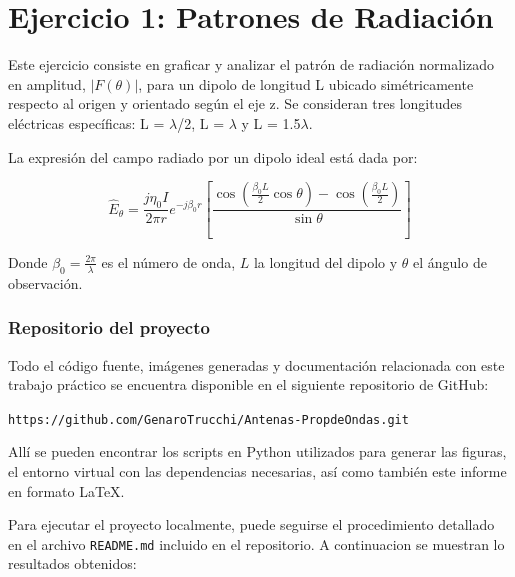 \section{Ejercicio 1: Patrones de Radiación}
Este ejercicio consiste en graficar y analizar el patrón de radiación normalizado en amplitud, $|F(\theta)|$, para un dipolo de longitud L ubicado simétricamente respecto al origen y orientado según el eje z. Se consideran tres longitudes eléctricas específicas: L = $\lambda$/2, L = $\lambda$ y L = 1.5$\lambda$.


La expresión del campo radiado por un dipolo ideal está dada por:

\[
\hat{E}_\theta = \frac{j \eta_0 I}{2\pi r} e^{-j\beta_0 r} \left[ \frac{\cos\left(\frac{\beta_0 L}{2} \cos\theta\right) - \cos\left(\frac{\beta_0 L}{2}\right)}{\sin\theta} \right]
\]

Donde $\beta_0 = \frac{2\pi}{\lambda}$ es el número de onda, $L$ la longitud del dipolo y $\theta$ el ángulo de observación.

\subsubsection*{Repositorio del proyecto}

Todo el código fuente, imágenes generadas y documentación relacionada con este trabajo práctico se encuentra disponible en el siguiente repositorio de GitHub:

\begin{center}
\texttt{https://github.com/GenaroTrucchi/Antenas-PropdeOndas.git}
\end{center}

Allí se pueden encontrar los scripts en Python utilizados para generar las figuras, el entorno virtual con las dependencias necesarias, así como también este informe en formato \LaTeX{}.

Para ejecutar el proyecto localmente, puede seguirse el procedimiento detallado en el archivo \texttt{README.md} incluido en el repositorio.
A continuacion se muestran lo resultados obtenidos:

\def\relativelengths{{0.12},{0.25},{0.50},{0.75},{1.25},{1.50},{1.75},{2.00},{2.25}}

\newcommand{\incluirImagenes}[1]{
  \begin{figure}
    \centering
    \begin{subfigure}[b]{0.45\textwidth}
        \texttt{[image: Imagenes2D/2D\_Lrel\_\#1.png]}
        \caption{Gráfico 2D}
    \end{subfigure}
    \begin{subfigure}[b]{0.45\textwidth}
        \texttt{[image: Imagenes3D/3D\_Lrel\_\#1.png]}
        \caption{Gráfico 3D}
    \end{subfigure}
    \caption{Patrón de radiación para $L/\lambda = #1$}
  \end{figure}
}

